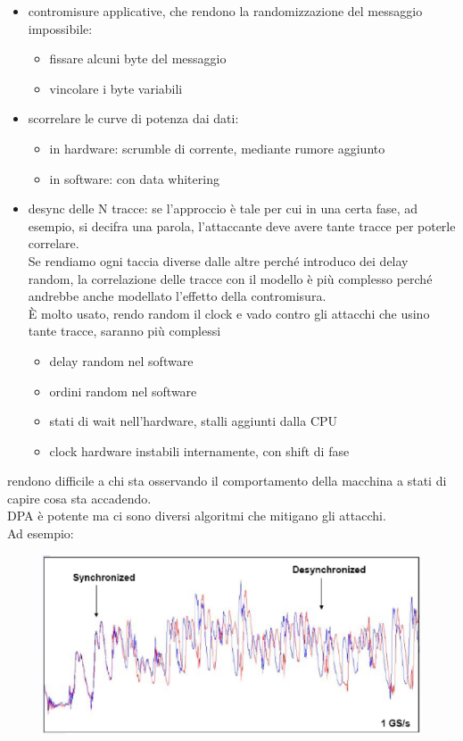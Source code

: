 \documentclass[oneside, 12pt]{extbook}
\begin{document}
\begin{itemize}
	\item contromisure applicative, che rendono la randomizzazione del messaggio impossibile:
	\begin{itemize}
		\item fissare alcuni byte del messaggio
		\item vincolare i byte variabili
	\end{itemize}
	\item scorrelare le curve di potenza dai dati:
	\begin{itemize}
		\item in hardware: scrumble di corrente, mediante rumore aggiunto
		\item in software: con data whitering
	\end{itemize}
	\item desync delle N tracce: se l'approccio è tale per cui in una certa fase, ad esempio, si decifra una parola, l'attaccante deve avere tante tracce per poterle correlare.
	\\Se rendiamo ogni taccia diverse dalle altre perché introduco dei delay random, la correlazione delle tracce con il modello è più complesso perché andrebbe anche modellato l'effetto della contromisura.
	\\È molto usato, rendo random il clock e vado contro gli attacchi che usino tante tracce, saranno più complessi
	\begin{itemize}
		\item delay random nel software
		\item ordini random nel software
		\item stati di wait nell'hardware, stalli aggiunti dalla CPU
		\item clock hardware instabili internamente, con shift di fase
	\end{itemize}
\end{itemize}
rendono difficile a chi sta osservando il comportamento della macchina a stati di capire cosa sta accadendo.
\\DPA è potente ma ci sono diversi algoritmi che mitigano gli attacchi.
\\Ad esempio:\\ 
\begin{figure}[!h]
	\includegraphics[scale=0.4]{immagini/hardware/sync_vs_desync.png}
\end{figure}
\end{document}
